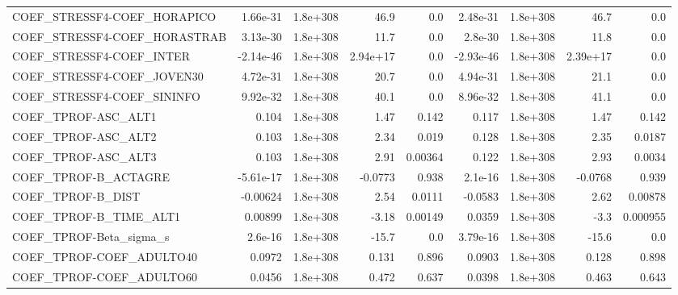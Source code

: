 \begin{tabular}{lrrrrrrrr}
COEF\_STRESSF4-COEF\_HORAPICO       &    1.66e-31 &     1.8e+308 &      46.9 &      0.0 &   2.48e-31 &    1.8e+308 &         46.7 &           0.0 \\
COEF\_STRESSF4-COEF\_HORASTRAB      &    3.13e-30 &     1.8e+308 &      11.7 &      0.0 &    2.8e-30 &    1.8e+308 &         11.8 &           0.0 \\
COEF\_STRESSF4-COEF\_INTER          &   -2.14e-46 &     1.8e+308 &  2.94e+17 &      0.0 &  -2.93e-46 &    1.8e+308 &     2.39e+17 &           0.0 \\
COEF\_STRESSF4-COEF\_JOVEN30        &    4.72e-31 &     1.8e+308 &      20.7 &      0.0 &   4.94e-31 &    1.8e+308 &         21.1 &           0.0 \\
COEF\_STRESSF4-COEF\_SININFO        &    9.92e-32 &     1.8e+308 &      40.1 &      0.0 &   8.96e-32 &    1.8e+308 &         41.1 &           0.0 \\
COEF\_TPROF-ASC\_ALT1               &       0.104 &     1.8e+308 &      1.47 &    0.142 &      0.117 &    1.8e+308 &         1.47 &         0.142 \\
COEF\_TPROF-ASC\_ALT2               &       0.103 &     1.8e+308 &      2.34 &    0.019 &      0.128 &    1.8e+308 &         2.35 &        0.0187 \\
COEF\_TPROF-ASC\_ALT3               &       0.103 &     1.8e+308 &      2.91 &  0.00364 &      0.122 &    1.8e+308 &         2.93 &        0.0034 \\
COEF\_TPROF-B\_ACTAGRE              &   -5.61e-17 &     1.8e+308 &   -0.0773 &    0.938 &    2.1e-16 &    1.8e+308 &      -0.0768 &         0.939 \\
COEF\_TPROF-B\_DIST                 &    -0.00624 &     1.8e+308 &      2.54 &   0.0111 &    -0.0583 &    1.8e+308 &         2.62 &       0.00878 \\
COEF\_TPROF-B\_TIME\_ALT1            &     0.00899 &     1.8e+308 &     -3.18 &  0.00149 &     0.0359 &    1.8e+308 &         -3.3 &      0.000955 \\
COEF\_TPROF-Beta\_sigma\_s           &     2.6e-16 &     1.8e+308 &     -15.7 &      0.0 &   3.79e-16 &    1.8e+308 &        -15.6 &           0.0 \\
COEF\_TPROF-COEF\_ADULTO40          &      0.0972 &     1.8e+308 &     0.131 &    0.896 &     0.0903 &    1.8e+308 &        0.128 &         0.898 \\
COEF\_TPROF-COEF\_ADULTO60          &      0.0456 &     1.8e+308 &     0.472 &    0.637 &     0.0398 &    1.8e+308 &        0.463 &         0.643 \\

\end{tabular}
